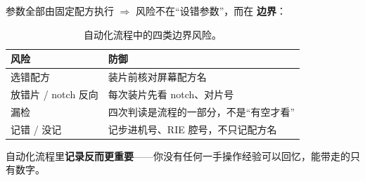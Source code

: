 \documentclass[UTF8,a4paper,11pt,fontset=windows]{ctexart}
\begin{document}
参数全部由固定配方执行 $\Rightarrow$ 风险不在“设错参数”，而在 \textbf{边界}：

\begin{table}[h]
\centering
\small
\begin{tabularx}{\textwidth}{@{}>{\raggedright\arraybackslash}p{4.6cm} X@{}}
\toprule
\textbf{风险} & \textbf{防御} \\
\midrule
选错配方 & 装片前核对屏幕配方名 \\
放错片 / notch 反向 & 每次装片先看 notch、对片号 \\
漏检 & 四次判读是流程的一部分，不是“有空才看” \\
记错 / 没记 & 记步进机号、RIE 腔号，不只记配方名 \\
\bottomrule
\end{tabularx}
\caption{自动化流程中的四类边界风险。}
\end{table}

自动化流程里\textbf{记录反而更重要}——你没有任何一手操作经验可以回忆，能带走的只有数字。
\end{document}
